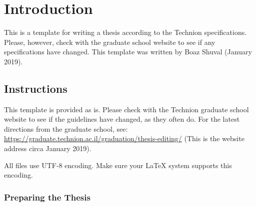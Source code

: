 \chapter{Introduction}
This is a template for writing a thesis according to the Technion specifications. 
Please, however, check with the graduate school website to see if any specifications have changed. 
This template was written by Boaz Shuval (January 2019). 

\section{Instructions}

This template is provided as is. Please check with the Technion graduate school website to see if the guidelines have changed, as they often do. For
the latest directions from the graduate school, see: 
\url{https://graduate.technion.ac.il/graduation/thesis-editing/}
(This is the website address circa January 2019). 

All files use UTF-8 encoding. Make sure your LaTeX system supports this encoding. 

\subsection{Preparing the Thesis}

